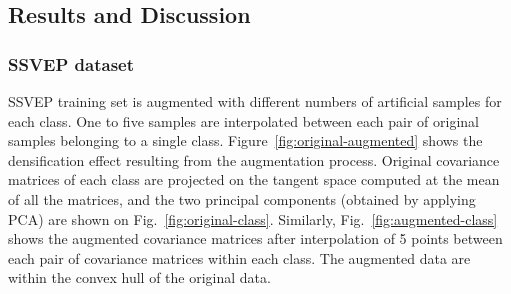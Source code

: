 
\subsection{Results and Discussion}
\label{sec:results}

\subsubsection{SSVEP dataset}
SSVEP training set is augmented with different numbers of artificial samples for each class. 
One to five samples are interpolated between each pair of original samples belonging to a single class.
Figure~\ref{fig:original-augmented} shows the densification effect resulting from the augmentation process. 
Original covariance matrices of each class are projected on the tangent space computed at the mean of all the matrices, and the two principal components (obtained by applying PCA) are shown on Fig.~\ref{fig:original-class}.
Similarly, Fig.~\ref{fig:augmented-class} shows the augmented covariance matrices after interpolation of 5 points between each pair of covariance matrices within each class. The augmented data are within the convex hull of the original data. 


